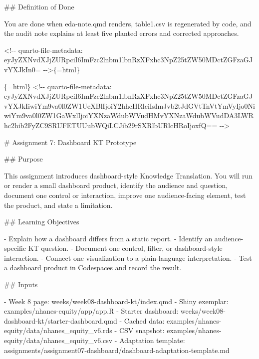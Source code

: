 \documentclass[
  letterpaper,
  DIV=11,
  numbers=noendperiod,
  oneside]{scrreprt}
\newenvironment{Shaded}{\begin{snugshade}}{\end{snugshade}}
\newcommand{\FunctionTok}[1]{\textcolor[rgb]{0.28,0.35,0.67}{#1}}
\newcommand{\InformationTok}[1]{\textcolor[rgb]{0.37,0.37,0.37}{#1}}
\newcommand{\NormalTok}[1]{\textcolor[rgb]{0.00,0.23,0.31}{#1}}
\newcommand{\SpecialStringTok}[1]{\textcolor[rgb]{0.13,0.47,0.30}{#1}}
\begin{document}
\begin{Shaded}
\begin{Highlighting}[numbers=left,,]
\FunctionTok{\#\# Definition of Done}

\NormalTok{You are done when }\InformationTok{\textasciigrave{}eda{-}note.qmd\textasciigrave{}}\NormalTok{ renders, }\InformationTok{\textasciigrave{}table1.csv\textasciigrave{}}\NormalTok{ is regenerated by code, and the audit note explains at least five planted errors and corrected approaches.}


\InformationTok{\textasciigrave{}\textless{}!{-}{-} quarto{-}file{-}metadata: eyJyZXNvdXJjZURpciI6ImFzc2lnbm1lbnRzXFxhc3NpZ25tZW50MDctZGFzaGJvYXJkIn0= {-}{-}\textgreater{}\textasciigrave{}}\NormalTok{\{=html\}}

\InformationTok{\textasciigrave{}\textasciigrave{}\textasciigrave{}\{=html\}}
\InformationTok{\textless{}!{-}{-} quarto{-}file{-}metadata: eyJyZXNvdXJjZURpciI6ImFzc2lnbm1lbnRzXFxhc3NpZ25tZW50MDctZGFzaGJvYXJkIiwiYm9va0l0ZW1UeXBlIjoiY2hhcHRlciIsImJvb2tJdGVtTnVtYmVyIjo0NiwiYm9va0l0ZW1GaWxlIjoiYXNzaWdubWVudHMvYXNzaWdubWVudDA3LWRhc2hib2FyZC9SRUFETUUubWQiLCJib29rSXRlbURlcHRoIjoxfQ== {-}{-}\textgreater{}}
\InformationTok{\textasciigrave{}\textasciigrave{}\textasciigrave{}}

\FunctionTok{\# Assignment 7: Dashboard KT Prototype }


\FunctionTok{\#\# Purpose}

\NormalTok{This assignment introduces dashboard{-}style Knowledge Translation. You will run or render a small dashboard product, identify the audience and question, document one control or interaction, improve one audience{-}facing element, test the product, and state a limitation.}

\FunctionTok{\#\# Learning Objectives}

\SpecialStringTok{{-} }\NormalTok{Explain how a dashboard differs from a static report.}
\SpecialStringTok{{-} }\NormalTok{Identify an audience{-}specific KT question.}
\SpecialStringTok{{-} }\NormalTok{Document one control, filter, or dashboard{-}style interaction.}
\SpecialStringTok{{-} }\NormalTok{Connect one visualization to a plain{-}language interpretation.}
\SpecialStringTok{{-} }\NormalTok{Test a dashboard product in Codespaces and record the result.}

\FunctionTok{\#\# Inputs}

\SpecialStringTok{{-} }\NormalTok{Week 8 page: }\InformationTok{\textasciigrave{}weeks/week08{-}dashboard{-}kt/index.qmd\textasciigrave{}}
\SpecialStringTok{{-} }\NormalTok{Shiny exemplar: }\InformationTok{\textasciigrave{}examples/nhanes{-}equity/app/app.R\textasciigrave{}}
\SpecialStringTok{{-} }\NormalTok{Starter dashboard: }\InformationTok{\textasciigrave{}weeks/week08{-}dashboard{-}kt/starter{-}dashboard.qmd\textasciigrave{}}
\SpecialStringTok{{-} }\NormalTok{Cached data: }\InformationTok{\textasciigrave{}examples/nhanes{-}equity/data/nhanes\_equity\_v6.rds\textasciigrave{}}
\SpecialStringTok{{-} }\NormalTok{CSV snapshot: }\InformationTok{\textasciigrave{}examples/nhanes{-}equity/data/nhanes\_equity\_v6.csv\textasciigrave{}}
\SpecialStringTok{{-} }\NormalTok{Adaptation template: }\InformationTok{\textasciigrave{}assignments/assignment07{-}dashboard/dashboard{-}adaptation{-}template.md\textasciigrave{}}


\end{Highlighting}
\end{Shaded}
\end{document}
